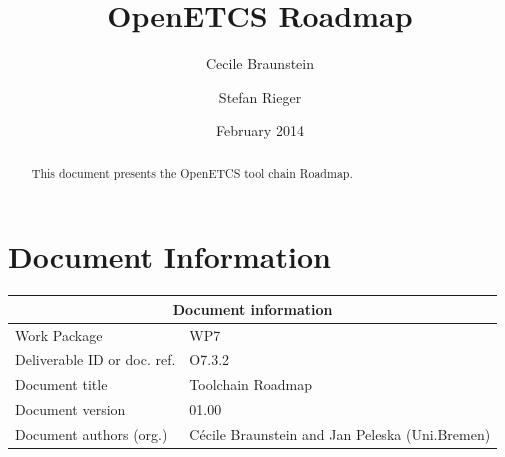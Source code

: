 \documentclass{openetcs_report}
\begin{document}
\frontmatter
{}




\title{OpenETCS Roadmap}


\date{February 2014}


\author{Cecile Braunstein \and Stefan Rieger}







\begin{abstract}
This document presents the OpenETCS tool chain Roadmap.
\end{abstract}


\maketitle
\tableofcontents

\newpage

\chapter{Document Information}

\begin{tabular}{|p{4.4cm}|p{8.7cm}|}
\hline
\multicolumn{2}{|c|}{Document information} \\
\hline
Work Package &  WP7  \\
Deliverable ID or doc. ref. & O7.3.2\\
\hline
Document title & Toolchain Roadmap \\
Document version & 01.00 \\
Document authors (org.)  & Cécile Braunstein and Jan Peleska (Uni.Bremen) \\
\hline
\end{tabular}
\end{document}

